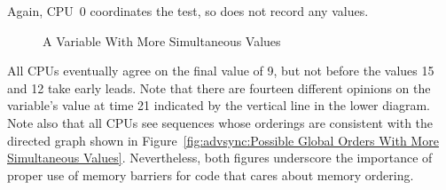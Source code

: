 Again, CPU~0 coordinates the test, so does not record any values.

\begin{figure}
\centering
{}
\caption{A Variable With More Simultaneous Values}
\end{figure}

All CPUs eventually agree on the final value of 9, but not before
the values 15 and 12 take early leads.
Note that there are fourteen different opinions on the variable's value
at time 21 indicated by the vertical line in the lower diagram.
Note also that all CPUs see sequences whose orderings are consistent with
the directed graph shown in
Figure~\ref{fig:advsync:Possible Global Orders With More Simultaneous Values}.
Nevertheless, both figures underscore the importance of
proper use of memory barriers for code that cares about memory ordering.

